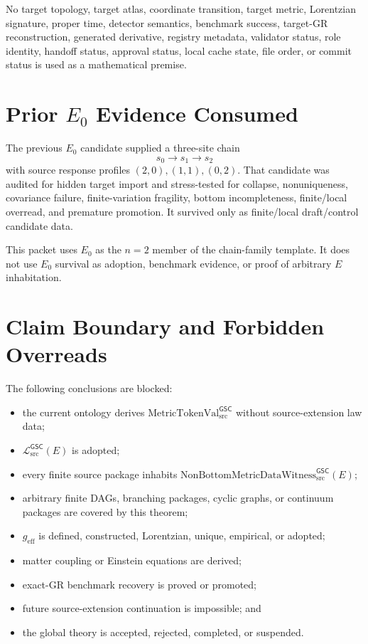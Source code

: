 \documentclass[11pt]{article}
\newcommand{\MetricTokenVal}{\mathrm{MetricTokenVal}_{\mathrm{src}}^{\mathsf{GSC}}}
\newcommand{\Witness}{\mathrm{NonBottomMetricDataWitness}_{\mathrm{src}}^{\mathsf{GSC}}}
\newcommand{\MetricData}{\mathcal{L}_{\mathrm{src}}^{\mathsf{GSC}}}
\newcommand{\geff}{g_{\mathrm{eff}}}
\begin{document}
No target topology, target atlas, coordinate transition, target metric,
Lorentzian signature, proper time, detector semantics, benchmark success,
target-GR reconstruction, generated derivative, registry metadata, validator
status, role identity, handoff status, approval status, local cache state,
file order, or commit status is used as a mathematical premise.

\section{Prior \(E_0\) Evidence Consumed}

The previous \(E_0\) candidate supplied a three-site chain
\[
  s_0\to s_1\to s_2
\]
with source response profiles \((2,0),(1,1),(0,2)\). That candidate was
audited for hidden target import and stress-tested for collapse,
nonuniqueness, covariance failure, finite-variation fragility, bottom
incompleteness, finite/local overread, and premature promotion. It survived
only as finite/local draft/control candidate data.

This packet uses \(E_0\) as the \(n=2\) member of the chain-family template.
It does not use \(E_0\) survival as adoption, benchmark evidence, or proof of
arbitrary \(E\) inhabitation.

\section{Claim Boundary and Forbidden Overreads}

The following conclusions are blocked:
\begin{itemize}[leftmargin=*]
  \item the current ontology derives \(\MetricTokenVal\) without
  source-extension law data;
  \item \(\MetricData(E)\) is adopted;
  \item every finite source package inhabits \(\Witness(E)\);
  \item arbitrary finite DAGs, branching packages, cyclic graphs, or
  continuum packages are covered by this theorem;
  \item \(\geff\) is defined, constructed, Lorentzian, unique, empirical, or
  adopted;
  \item matter coupling or Einstein equations are derived;
  \item exact-GR benchmark recovery is proved or promoted;
  \item future source-extension continuation is impossible; and
  \item the global theory is accepted, rejected, completed, or suspended.
\end{itemize}
\end{document}
